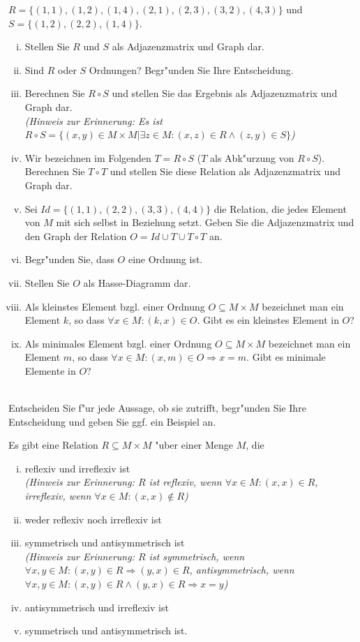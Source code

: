 $R=\{(1,1),(1,2),(1,4),(2,1),(2,3),(3,2),(4,3)\}$ und $S=\{(1,2),(2,2),(1,4)\}$.
\begin{enumerate}[(i)]
\item Stellen Sie $R$ und $S$ als Adjazenzmatrix und Graph dar.
\item Sind $R$ oder $S$ Ordnungen? Begr"unden Sie Ihre Entscheidung.
\item Berechnen Sie $R\circ S$ und stellen Sie das Ergebnis als Adjazenzmatrix und Graph dar.\\
\textit{(Hinweis zur Erinnerung: Es ist $R\circ S=\{(x,y)\in M\times M|\exists z\in M: (x,z)\in R\wedge (z,y)\in S\}$)}
\item Wir bezeichnen im Folgenden $T=R\circ S$ ($T$ als Abk"urzung von $R\circ S$). Berechnen Sie $T\circ T$ und stellen Sie diese Relation als Adjazenzmatrix und Graph dar.
\item Sei $Id=\{(1,1),(2,2),(3,3),(4,4)\}$ die Relation, die jedes Element von $M$ mit sich selbst in Beziehung setzt. Geben Sie die Adjazenzmatrix und den Graph der Relation $O=Id\cup T\cup T\circ T$ an.
\item Begr"unden Sie, dass $O$ eine Ordnung ist.
\item Stellen Sie $O$ als Hasse-Diagramm dar.
\item Als kleinstes Element bzgl. einer Ordnung $O\subseteq M\times M$ bezeichnet man ein Element $k$, so dass $\forall x\in M:(k,x)\in O$. Gibt es ein kleinstes Element in $O$?
\item Als minimales Element bzgl. einer Ordnung $O\subseteq M\times M$ bezeichnet man ein Element $m$, so dass $\forall x\in M:(x,m)\in O\Rightarrow x=m$. Gibt es minimale Elemente in $O$?
\end{enumerate}

\\
Entscheiden Sie f"ur jede Aussage, ob sie zutrifft, begr"unden Sie Ihre Entscheidung und geben Sie ggf. ein Beispiel an.

Es gibt eine Relation $R\subseteq M\times M$ "uber einer Menge $M$, die 
\begin{enumerate}[(i)]
\item reflexiv und irreflexiv ist\\
\textit{(Hinweis zur Erinnerung: $R$ ist reflexiv, wenn $\forall x\in M:(x,x)\in R$, irreflexiv, wenn $\forall x\in M:(x,x)\notin R$)}
\item weder reflexiv noch irreflexiv ist
\item symmetrisch und antisymmetrisch ist\\
\textit{(Hinweis zur Erinnerung: $R$ ist symmetrisch, wenn $\forall x,y\in M:(x,y)\in R\Rightarrow (y,x)\in R$, antisymmetrisch, wenn $\forall x,y\in M:(x,y)\in R\wedge (y,x)\in R\Rightarrow x=y$)}
\item antisymmetrisch und irreflexiv ist
\item symmetrisch und antisymmetrisch ist.
\end{enumerate}

